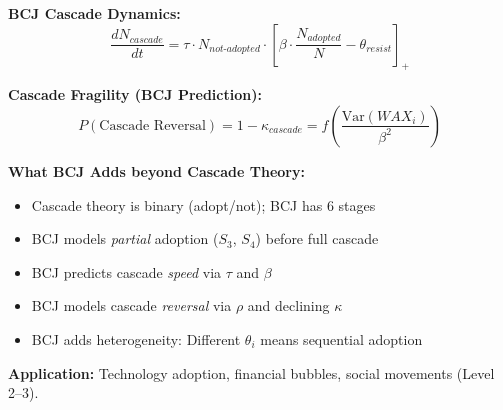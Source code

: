 \begin{tcolorbox}[colback=green!5!white, colframe=green!75!black,
    title=Theorem BCJ-T29: Social Learning / Information Cascades as Special Case]
\textbf{BCJ Cascade Dynamics:}
\begin{equation}
\frac{dN_{cascade}}{dt} = \tau \cdot N_{not\text{-}adopted} \cdot \left[\beta \cdot \frac{N_{adopted}}{N} - \theta_{resist}\right]_+
\end{equation}

\textbf{Cascade Fragility (BCJ Prediction):}
\begin{equation}
P(\text{Cascade Reversal}) = 1 - \kappa_{cascade} = f\left(\frac{\text{Var}(WAX_i)}{\beta^2}\right)
\end{equation}

\textbf{What BCJ Adds beyond Cascade Theory:}
\begin{itemize}[nosep]
\item Cascade theory is binary (adopt/not); BCJ has 6 stages
\item BCJ models \textit{partial} adoption ($S_3$, $S_4$) before full cascade
\item BCJ predicts cascade \textit{speed} via $\tau$ and $\beta$
\item BCJ models cascade \textit{reversal} via $\rho$ and declining $\kappa$
\item BCJ adds heterogeneity: Different $\theta_i$ means sequential adoption
\end{itemize}

\textbf{Application:} Technology adoption, financial bubbles, social movements (Level 2--3).
\end{tcolorbox}


